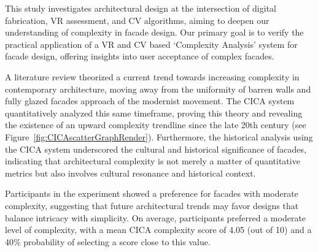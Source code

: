 


This study investigates architectural design at the intersection of digital fabrication, VR assessment, and CV algorithms, aiming to deepen our understanding of complexity in facade design.
Our primary goal is to verify the practical application of a VR and CV based `Complexity Analysis' system for facade design, offering insights into user acceptance of complex facades.

A literature review theorized a current trend towards increasing complexity in contemporary architecture, moving away from the uniformity of barren walls and fully glazed facades approach of the modernist movement.
The CICA system quantitatively analyzed this same timeframe, proving this theory and revealing the existence of an upward complexity trendline since the late 20th century (see Figure~\ref{fig:CICAscatterGraphRender}).
Furthermore, the historical analysis using the CICA system underscored the cultural and historical significance of facades, indicating that architectural complexity is not merely a matter of quantitative metrics but also involves cultural resonance and historical context.



Participants in the experiment showed a preference for facades with moderate complexity, suggesting that future architectural trends may favor designs that balance intricacy with simplicity.
On average, participants preferred a moderate level of complexity, with a mean CICA complexity score of 4.05 (out of 10) and a 40\% probability of selecting a score close to this value.

